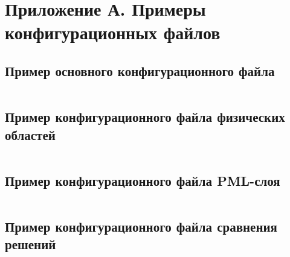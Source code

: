 \documentclass[a4paper,14pt]{article}
\makeatletter
\newcommand{\labelname}[1]{%
	\def\@currentlabelname{#1}}%
\makeatother
\begin{document}
\clearpage
{}
\section*{Приложение А. Примеры конфигурационных файлов}
\labelname{А}\label{app:config_example}

\subsection*{Пример основного конфигурационного файла}

\begin{singlespace}
\begin{scriptsize}
\inputminted{ini}{sources/configs/config.ini}
\end{scriptsize}
\end{singlespace}

\subsection*{Пример конфигурационного файла физических областей}

\begin{singlespace}
\begin{scriptsize}
\inputminted{ini}{sources/configs/phys.ini}
\end{scriptsize}
\end{singlespace}

\subsection*{Пример конфигурационного файла PML-слоя}

\begin{singlespace}
\begin{scriptsize}
\inputminted{ini}{sources/configs/config_pml.ini}
\end{scriptsize}
\end{singlespace}

\subsection*{Пример конфигурационного файла сравнения решений}

\begin{singlespace}
\begin{scriptsize}
\inputminted{ini}{sources/configs/diff.ini}
\end{scriptsize}
\end{singlespace}
\end{document}
